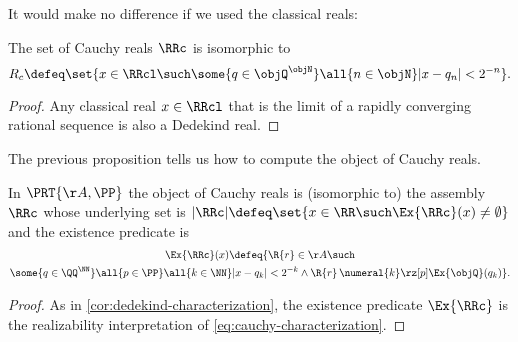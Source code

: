 It would make no difference if we used the classical reals:

\begin{propositionC}
  \label{prop:cauch-real-sub-classical}%
  The set of Cauchy reals $\RRc$ is isomorphic to
  \begin{equation}
    \label{eq:cauchy-characterization}%
    R_c \defeq \set{x \in \RRcl \such \some{q \in \objQ^\objN} \all{n \in \objN} |x - q_n| < 2^{-n}}.
  \end{equation}
\end{propositionC}


\begin{proof}
  Any classical real $x \in \RRcl$ that is the limit of a rapidly converging rational sequence is also a Dedekind real.
\end{proof}

The previous proposition tells us how to compute the object of Cauchy reals.

\begin{corollary}
  \label{cor:cauchy-characterization}%
  In $\PRT{\AA, \PP}$ the object of Cauchy reals is (isomorphic to) the assembly $\RRc$ whose
  underlying set is
  $
    |\RRc| \defeq \set{x \in \RR \such \Ex{\RRc}(x) \neq \emptyset}
  $
  and the existence predicate is
  \begin{multline*}
    \Ex{\RRc}(x) \defeq
    \{\R{r} \in \AA \such \\
      \some{q \in \QQ^\NN}
      \all{p \in \PP}
      \all{k \in \NN}
      |x - q_k| < 2^{-k} \land
      \R{r} \, \numeral{k} \rz[p] \Ex{\objQ}(q_k)
   \}.
  \end{multline*}
\end{corollary}

\begin{proof}
  As in \cref{cor:dedekind-characterization}, the existence predicate $\Ex{\RRc}$ is the realizability interpretation of \eqref{eq:cauchy-characterization}.
\end{proof}

